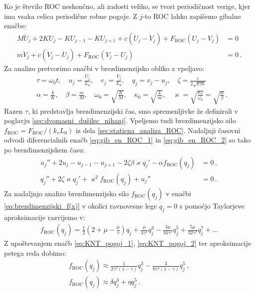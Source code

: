         Ko je število ROC neskončno, ali zadosti veliko, se tvori periodičnost verige, kjer ima vsaka celica periodične robne pogoje. Z $j$-to ROC lahko zapišemo gibalne enačbe: 
        \begin{align}
            M \ddot{U}_j+2 K U_j-K U_{j-1}-K U_{j+1}+c\left(\dot{U}_j-\dot{V}_j\right)+F_{\mathrm{ROC}}(U_j-V_j)&=0 \label{eq:gib_en_ROC_1} \\
            m \ddot{V}_j+c\left(\dot{V}_j-\dot{U}_j\right)+F_{\mathrm{ROC}}\left(V_j-U_j\right)&=0 \label{eq:gib_en_ROC_2} \,.
        \end{align}
        Za analizo pretvorimo enačbi v brezdimenzijsko obliko z vpeljavo: 
        \begin{align}
            &\tau=\omega_0 t, \quad  u_j=\frac{U_j}{L_0}, \quad v_j=\frac{V_j}{L_0}, \quad q_j=v_j-u_j, \quad \zeta=\frac{c}{2\sqrt{k \, m}} \nonumber \\ 
            &\alpha=\frac{k}{K}, \quad \beta=\frac{m}{M}, \quad \omega_0=\sqrt{\frac{K}{M}}, \quad \kappa_0=\sqrt{\frac{k}{m}}, \quad \varkappa=\sqrt{\frac{\kappa_0}{\omega_0}}=\sqrt{\frac{\alpha}{\beta}}\,.
        \end{align}
        Razen $\tau$, ki predstavlja brezdimenzijski čas, smo spremenljivke že definirali v poglavju \ref{sec:dvomasni_dušilec_nihanj}. Vpeljemo tudi brezdimenzijsko silo $f_{\mathrm{ROC}}=F_{\mathrm{ROC}}/(k_v L_0)$ iz dela \ref{sec:staticna_analiza_ROC}. Nadaljnji časovni odvodi diferencialnih enačb \eqref{eq:gib_en_ROC_1} in \eqref{eq:gib_en_ROC_2} so tako po brezdimenzijskem času:
        \begin{align}
            u_{j}''+2 u_{j} - u_{j-1} - u_{j+1} - 2 \zeta \beta \varkappa q_{j}' - \alpha f_{\mathrm{ROC}}(q_{j}) &= 0  \label{eq:gib_en_ROC_3} \,,\\
            q_{j}''+2 \zeta \varkappa q_{j}'+ \varkappa^2 f_{\mathrm{ROC}} (q_{j}) + u_{j}''&=0  \label{eq:gib_en_ROC_4} \,.
        \end{align}
        Za nadaljnjo analizo brezdimenzijsko silo $f_{\mathrm{ROC}}(q_j)$ v enačbi \eqref{eq:brezdimenzijski_f(x)} v okolici ravnovesne lege $q_j=0$ s pomočjo Taylorjeve aproksimacije razvijemo v:
        \begin{align}
            f_{\mathrm{ROC}}(q_j) = \frac{1}{2}\left(2+\mu-\frac{\mu}{\gamma}\right)  q_j + \frac{\mu }{4 \gamma^3} q_j^3 -\frac{3 \mu }{16 \gamma^5} q_j^5 + \frac{5 \mu}{32 \gamma^7} q_j^7 + ...
        \end{align}
        Z upoštevanjem enačb \eqref{eq:KNT_pogoj_1}, \eqref{eq:KNT_pogoj_2} ter aproksimacije petega reda dobimo:
        \begin{align}
            f_{\mathrm{ROC}}(q_j) \approx \frac{1}{2 \gamma^2(1-\gamma)} q_j^3-\frac{3}{8  \gamma^4 (1-\gamma)} q_j^5 \nonumber \,, \\
            f_{\mathrm{ROC}}(q_j) \approx \delta q_j^3 + \eta q_j^5\,.
        \end{align}
        
